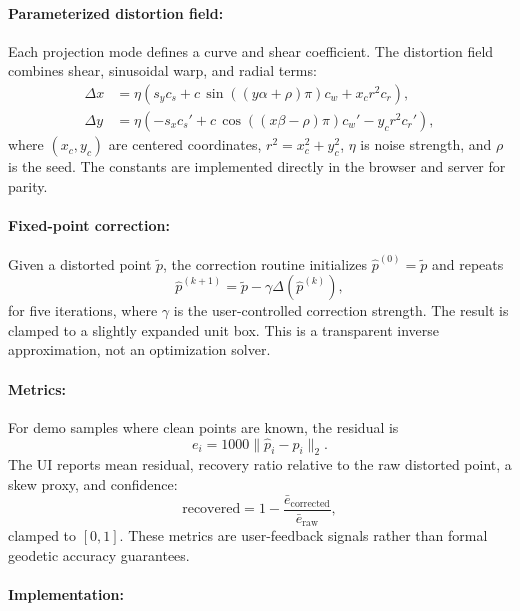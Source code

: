 \documentclass{article}
\begin{document}
\paragraph{Parameterized distortion field:}

Each projection mode defines a curve and shear coefficient. The distortion field combines shear, sinusoidal warp, and radial terms:
\begin{align}
  \Delta x &= \eta\left(s_y c_s + c\,\sin((y\alpha+\rho)\pi)c_w + x_c r^2 c_r\right),\\
  \Delta y &= \eta\left(-s_x c_s' + c\,\cos((x\beta-\rho)\pi)c_w' - y_c r^2 c_r'\right),
\end{align}
where $(x_c,y_c)$ are centered coordinates, $r^2=x_c^2+y_c^2$, $\eta$ is noise strength, and $\rho$ is the seed. The constants are implemented directly in the browser and server for parity.

\paragraph{Fixed-point correction:}

Given a distorted point $\tilde{p}$, the correction routine initializes $\hat{p}^{(0)}=\tilde{p}$ and repeats
\begin{equation}
  \hat{p}^{(k+1)} = \tilde{p} - \gamma \Delta(\hat{p}^{(k)}),
\end{equation}
for five iterations, where $\gamma$ is the user-controlled correction strength. The result is clamped to a slightly expanded unit box. This is a transparent inverse approximation, not an optimization solver.

\paragraph{Metrics:}

For demo samples where clean points are known, the residual is
\begin{equation}
  e_i = 1000\|\hat{p}_i-p_i\|_2.
\end{equation}
The UI reports mean residual, recovery ratio relative to the raw distorted point, a skew proxy, and confidence:
\begin{equation}
  \text{recovered}=1-\frac{\bar{e}_{\text{corrected}}}{\bar{e}_{\text{raw}}},
\end{equation}
clamped to $[0,1]$. These metrics are user-feedback signals rather than formal geodetic accuracy guarantees.

\paragraph{Implementation:}
\end{document}
